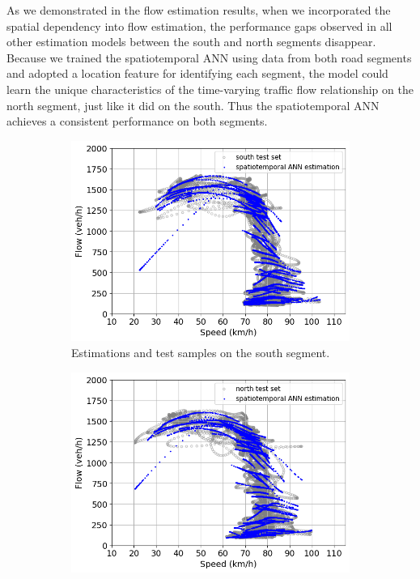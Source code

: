 \documentclass[english]{kththesis}
\begin{document}
As we demonstrated in the flow estimation results, when we incorporated the spatial dependency into flow estimation, the performance gaps observed in all other estimation models between the south and north segments disappear. Because we trained the spatiotemporal ANN using data from both road segments and adopted a location feature for identifying each segment, the model could learn the unique characteristics of the time-varying traffic flow relationship on the north segment, just like it did on the south. Thus the spatiotemporal ANN achieves a consistent performance on both segments. 

\begin{figure}[!ht]
    \centering
    \begin{subfigure}{0.49\textwidth}
        \centering
        \includegraphics[width=\textwidth]{spatiotemporal_ann_south.png}
        \caption{Estimations and test samples on the south segment.}
        \label{subfig:spatiotemporal_ann_south}
    \end{subfigure}
    \hfill
    \begin{subfigure}{0.49\textwidth}
        \centering
        \includegraphics[width=\textwidth]{spatiotemporal_ann_north.png}

\end{subfigure}
\end{figure}
\end{document}
